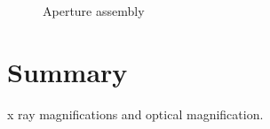 \begin{figure}
\centering
{}
\caption{Aperture assembly}
\label{fig:aperture}
\end{figure}

\section{Summary}

 x ray magnifications and optical magnification.\\
